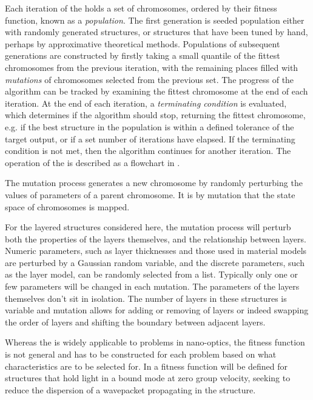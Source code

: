 Each iteration of the \ea holds a set of chromosomes, ordered by their fitness
function, known as a \emph{population}.
The first generation is seeded population either
with randomly generated structures, or structures that have been tuned by hand,
perhaps by approximative theoretical methods.
Populations of subsequent generations are constructed by firstly taking a small
quantile of the fittest chromosomes from the previous iteration, with the
remaining places filled with \emph{mutations} of chromosomes selected from the
previous set.
The progress of the algorithm can be tracked by examining the fittest chromosome
at the end of each iteration.
At the end of each iteration, a \emph{terminating condition} is evaluated, which
determines if the algorithm should stop, returning the fittest chromosome, e.g.
if the best structure in the population is within a defined tolerance of the
target output, or if a set number of iterations have elapsed.
If the terminating condition is not met, then the algorithm continues for
another iteration.
The operation of the \ea is described as a flowchart in .

The mutation process generates a new chromosome by randomly perturbing the
values of parameters of a parent chromosome.
It is by mutation that the state space of chromosomes is mapped.

For the layered structures considered here, the mutation process will perturb
both the properties of the layers themselves, and the relationship between
layers.
Numeric parameters, such as layer thicknesses and those used in material
models are perturbed by a Gaussian random variable, and the discrete
parameters, such as the layer model, can be randomly selected from a list.
Typically only one or few parameters will be changed in each mutation.
The parameters of the layers themselves don't sit in isolation.
The number of layers in these structures is variable and mutation
allows for adding or removing of layers or indeed swapping the order of layers
and shifting the boundary between adjacent layers.

Whereas the \ea is widely applicable to problems in nano-optics,
the fitness function is not general and has to be constructed for each problem
based on what characteristics are to be selected for.
In  a fitness function will be defined for structures that
hold light in a bound mode at zero group velocity, seeking to reduce the
dispersion of a wavepacket propagating in the structure.
